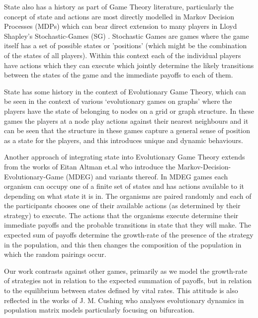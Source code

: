 State also has a history as part of Game Theory literature, particularly the concept of state and actions are most directly modelled in Markov Decision Processes (MDPs) which can bear direct extension to many players in Lloyd Shapley's Stochastic-Games (SG) \cite{shapley53,Solan2015}. Stochastic Games are games where the game itself has a set of possible states or 'positions' (which might be the combination of the states of all players). Within this context each of the individual players have actions which they can execute which jointly determine the likely transitions between the states of the game and the immediate payoffs to each of them.

State has some history in the context of Evolutionary Game Theory, which can be seen in the context of various `evolutionary games on graphs' where the players have the state of belonging to nodes on a grid or graph structure. In these games the players at a node play actions against their nearest neighbours and it can be seen that the structure in these games capture a general sense of position as a state for the players, and this introduces unique and dynamic behaviours.\cite{nowak,spacial2,spacial4}

Another approach of integrating state into Evolutionary Game Theory extends from the works of Eitan Altman et.al \cite{markov2,markov3,markov4,markov5,markov8,markov9} who introduce the Markov-Decision-Evolutionary-Game (MDEG) and variants thereof.
In MDEG games each organism can occupy one of a finite set of states and has actions available to it depending on what state it is in.
The organisms are paired randomly and each of the participants chooses one of their available actions (as determined by their strategy) to execute.
The actions that the organisms execute determine their immediate payoffs and the probable transitions in state that they will make.
The expected sum of payoffs determine the growth-rate of the presence of the strategy in the population, and this then changes the composition of the population in which the random pairings occur.

Our work contrasts against other games, primarily as we model the growth-rate of strategies not in relation to the expected summation of payoffs, but in relation to the equilibrium between states defined by vital rates. This attitude is also reflected in the works of J. M. Cushing \cite{doi:10.1080/10236198.2016.1177522, Cushing2017,doi:10.1080/17513758.2019.1574034} who analyses evolutionary dynamics in population matrix models particularly focusing on bifurcation.

